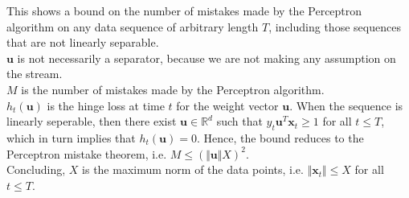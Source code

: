 \begin{itemize}
            This shows a bound on the number of mistakes made by the Perceptron algorithm on any data sequence of arbitrary length $T$, including those sequences that are not linearly separable.\\
           
            $\boldsymbol{u}$ is not necessarily a separator, because we are not making any
assumption on the stream.\\
            $M$ is the number of mistakes made by the Perceptron algorithm.\\
            $h_{t}(\boldsymbol{u})$ is the hinge loss at time $t$ for the weight vector $\boldsymbol{u}$. When the sequence is linearly seperable, then there exist $\boldsymbol{u} \in \mathbb{R}^d$ such that $y_{t} \boldsymbol{u}^T \boldsymbol{x}_{t} \geq 1$ for all $t \leq T$, which in turn implies that $h_{t}(\boldsymbol{u}) = 0$. Hence, the bound reduces to the Perceptron mistake theorem, i.e. $M \leq (\Vert \boldsymbol{u} \Vert X)^2$.\\
            Concluding, $X$ is the maximum norm of the data points, i.e. $\Vert \boldsymbol{x}_{t} \Vert \leq X$ for all $t \leq T$.
\end{itemize}
